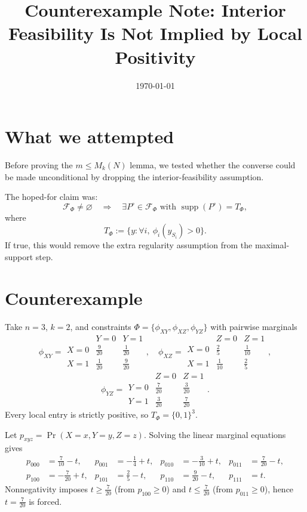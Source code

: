 \documentclass{article}
\title{Counterexample Note: Interior Feasibility Is Not Implied by Local Positivity}
\author{}
\date{\today}
\begin{document}
\maketitle

\section*{What we attempted}
Before proving the \(m \le M_k(N)\) lemma, we tested whether the converse could be made unconditional by dropping the interior-feasibility assumption.

The hoped-for claim was:
\[
\mathcal{F}_\Phi \neq \varnothing
\quad\Longrightarrow\quad
\exists P^\circ \in \mathcal{F}_\Phi \text{ with } \operatorname{supp}(P^\circ)=T_\Phi,
\]
where
\[
T_\Phi := \{y : \forall i,\ \phi_i(y_{S_i})>0\}.
\]
If true, this would remove the extra regularity assumption from the maximal-support step.

\section*{Counterexample}
Take \(n=3\), \(k=2\), and constraints \(\Phi=\{\phi_{XY},\phi_{XZ},\phi_{YZ}\}\) with pairwise marginals
\[
\phi_{XY}=
\begin{array}{c|cc}
 & Y=0 & Y=1\\\hline
X=0 & \tfrac{9}{20} & \tfrac{1}{20}\\
X=1 & \tfrac{1}{20} & \tfrac{9}{20}
\end{array},
\quad
\phi_{XZ}=
\begin{array}{c|cc}
 & Z=0 & Z=1\\\hline
X=0 & \tfrac{2}{5} & \tfrac{1}{10}\\
X=1 & \tfrac{1}{10} & \tfrac{2}{5}
\end{array},
\]
\[
\phi_{YZ}=
\begin{array}{c|cc}
 & Z=0 & Z=1\\\hline
Y=0 & \tfrac{7}{20} & \tfrac{3}{20}\\
Y=1 & \tfrac{3}{20} & \tfrac{7}{20}
\end{array}.
\]
Every local entry is strictly positive, so \(T_\Phi=\{0,1\}^3\).

Let \(p_{xyz}=\Pr(X=x,Y=y,Z=z)\). Solving the linear marginal equations gives
\[
\begin{aligned}
p_{000}&=\tfrac{7}{10}-t, & p_{001}&=-\tfrac14+t, & p_{010}&=-\tfrac{3}{10}+t, & p_{011}&=\tfrac{7}{20}-t,\\
p_{100}&=-\tfrac{7}{20}+t, & p_{101}&=\tfrac25-t, & p_{110}&=\tfrac{9}{20}-t, & p_{111}&=t.
\end{aligned}
\]
Nonnegativity imposes \(t\ge \tfrac{7}{20}\) (from \(p_{100}\ge0\)) and \(t\le \tfrac{7}{20}\) (from \(p_{011}\ge0\)), hence \(t=\tfrac{7}{20}\) is forced.
\end{document}
